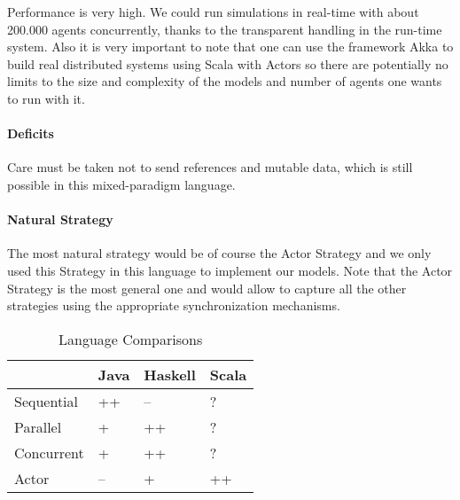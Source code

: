 Performance is very high. We could run simulations in real-time with about 200.000 agents concurrently, thanks to the transparent handling in the run-time system. Also it is very important to note that one can use the framework Akka to build real distributed systems using Scala with Actors so there are potentially no limits to the size and complexity of the models and number of agents one wants to run with it.

\paragraph{Deficits}
Care must be taken not to send references and mutable data, which is still possible in this mixed-paradigm language.

\paragraph{Natural Strategy}
The most natural strategy would be of course the Actor Strategy and we only used this Strategy in this language to implement our models. Note that the Actor Strategy is the most general one and would allow to capture all the other strategies using the appropriate synchronization mechanisms.



\begin{table*}[t]
\centering
\caption{Language Comparisons}
\label{tab:language_comparisons}
\begin{tabular}{l || l | l | l  }
	 			& Java 	& Haskell 	& Scala	\\ \hline \hline

Sequential		& ++	& --		& ?		\\  
Parallel		& +		& ++		& ?		\\  
Concurrent		& +		& ++		& ?		\\  
Actor			& --	& +			& ++	\\  

\end{tabular}
\end{table*}